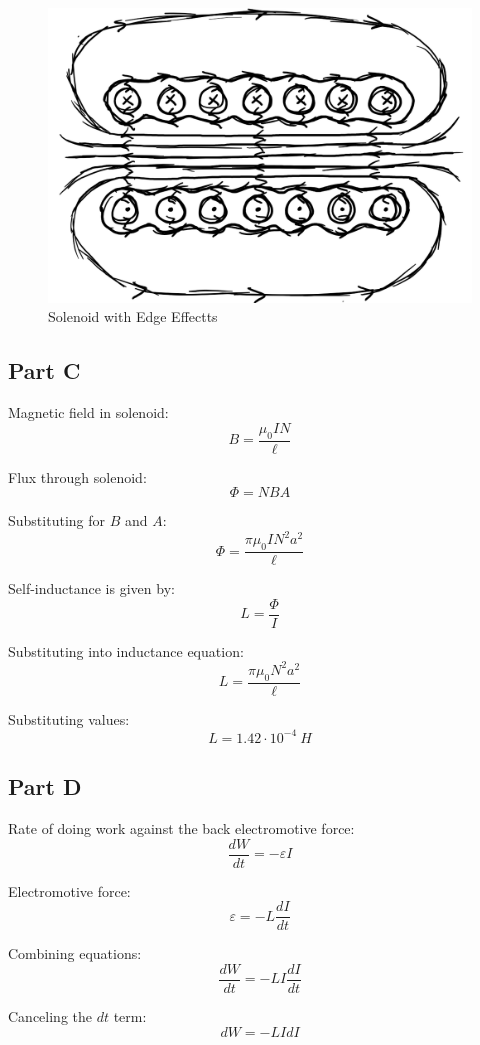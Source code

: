 \documentclass{article}
\begin{document}
\begin{figure}[H]
  \centering
  \includegraphics[scale=0.5]{"Solenoid"}
  \caption{Solenoid with Edge Effectts}
\end{figure}

\subsection*{Part C}

Magnetic field in solenoid:
$$ B = \frac{ \mu_0 I N}{\ell} $$

Flux through solenoid:
$$ \Phi = N B A $$

Substituting for $B$ and $A$:
$$ \Phi = \frac{ \pi \mu_0 I N^2 a^2}{\ell} $$

Self-inductance is given by:
$$ L = \frac{\Phi}{I} $$

Substituting into inductance equation:
$$ L = \frac{ \pi \mu_0 N^2 a^2}{\ell} $$

Substituting values:
$$ L = 1.42 \cdot 10^{-4}\ \si{H} $$

\subsection*{Part D}

Rate of doing work against the back electromotive force:
$$ \frac{dW}{dt} = - \varepsilon I $$

Electromotive force:
$$ \varepsilon = -L \frac{dI}{dt} $$

Combining equations:
$$ \frac{dW}{dt} = -L I \frac{dI}{dt} $$

Canceling the $dt$ term:
$$ dW = -L I dI $$
\end{document}
